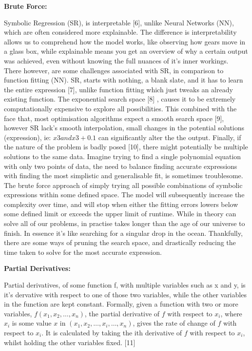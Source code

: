 \documentclass{article}
\begin{document}
\begin{center} 
  \textbf {\Large  Brute Force:}
\end{center}
Symbolic Regression (SR), is interpretable [6], unlike Neural Networks (NN), which are often considered more explainable. The difference is interpretability allows us to comprehend how the model works,
like observing how gears move in a glass box, while explainable means you get an overview of why a
certain output was achieved, even without knowing the full nuances of it’s inner workings.\\

There however, are some challenges associated with SR, in comparison to function fitting (NN). SR,
starts with nothing, a blank slate, and it has to learn the entire expression [7], unlike function fitting
which just tweaks an already existing function. The exponential search space [8] , causes it to be
extremely computationally expensive to explore all possibilities. This combined with the face that,
most optimisation algorithms expect a smooth search space [9], however SR lack’s smooth interpolation, small changes in the potential solutions (expression), ie: $ x3 and x3 + 0.1$ can significantly alter
the the output. Finally, if the nature of the problem is badly posed [10], there might potentially be
multiple solutions to the same data. Imagine trying to find a single polynomial equation with only two
points of data, the need to balance finding accurate expressions with finding the most simplistic and
generalisable fit, is sometimes troublesome.\\

The brute force approach of simply trying all possible combinations of symbolic expressions within some defined space. The model will subsequently increase the complexity over time, and will stop when either the fitting errors lowers below some defined limit or exceeds the upper limit of runtime. While in theory can solve all of our problems, in practise takes longer than the age of our universe to finish. In essence it's like searching for a singular drop in the ocean. Thankfully, there are some ways of pruning the search space, and drastically reducing the time taken to solve for the most accurate expression. \\ 

\begin{center} 
  \textbf {\Large Partial Derivatives:}
\end{center}

Partial derivatives, of some function f, with multiple variables such as x and y, is it's dervative with respect to one of those two variables, while the other variables in the function are kept constant. Formally, given a function with two or more variables, $f(x_1, x_2, \ldots, x_n) $, the partial derivative of $f$ with respect to $x_i$, where $x_i$ is some value $x$ in $(x_1, x_2, \ldots, x_i, \ldots, x_n)$, gives the rate of change of $f$ with respect to $x_i$. It is calculated by taking the ith derivative of $f$ with respect to $x_i$, whilst holding the other variables fixed. [11] \\
\end{document}
